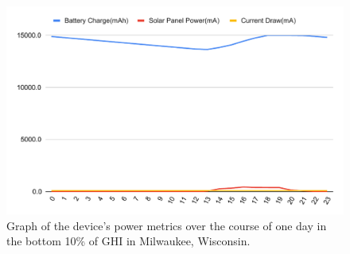 \documentclass[fleqn,10pt]{SelfArx} %
\begin{document}
	\begin{figure}[h]
		\centering
		\includegraphics[width=1\linewidth]{Figures/LowDay}
		\caption[Power Consumption Graph]{Graph of the device's power metrics over the course of one day in the bottom 10\% of GHI in Milwaukee, Wisconsin.}
		\label{fig:botPowerGen}
	\end{figure} 
	
\end{document}
